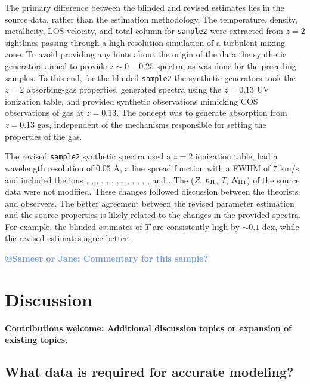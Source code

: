 \documentclass[fleqn,usenatbib]{mnras}
\makeatletter
\newcommand{\thoughts}[1]{\textcolor{BurntOrange}{\textbf{Contributions welcome: #1}}}
\newcommand{\atsameer}[1]{\textcolor{CornflowerBlue}{\textbf{@Sameer or Jane: #1}}}
\newcommand{\NHI}{N_{\ion{H}{I}}}
\makeatother
\begin{document}
The primary difference between the blinded and revised estimates lies in the source data,
rather than the estimation methodology.
The temperature, density, metallicity, LOS velocity, and total column for \texttt{sample2} were extracted from $z=2$ sightlines passing through a high-resolution simulation of a turbulent mixing zone.
To avoid providing any hints about the origin of the data the synthetic generators aimed to provide $z \sim 0 - 0.25$ spectra,
as was done for the preceding samples.
To this end, for the blinded \texttt{sample2} the synthetic generators took the $z=2$ absorbing-gas properties,
generated spectra using the $z=0.13$ UV ionization table,
and provided synthetic observations mimicking COS observations of gas at $z=0.13$.
The concept was to generate absorption from $z=0.13$ gas,
independent of the mechanisms responsible for setting the properties of the gas.

The revised \texttt{sample2} synthetic spectra used a $z=2$ ionization table,
had a wavelength resolution of 0.05 \AA,
a line spread function with a FWHM of 7 km/s,
and included the ions , , , , , , , , , , , , , and .
The ($Z$, $n_{\rm H}$, $T$, $\NHI$) of the source data were not modified.
These changes followed discussion between the theorists and observers.
The better agreement between the revised parameter estimation and the source properties is likely related to the changes in the provided spectra.
For example, the blinded estimates of $T$ are consistently high by $\sim 0.1$ dex,
while the revised estimates agree better.

\atsameer{Commentary for this sample?}

\section{Discussion}
\label{s: discussion}

\thoughts{Additional discussion topics or expansion of existing topics.}

\subsection{What data is required for accurate modeling?}
\end{document}
